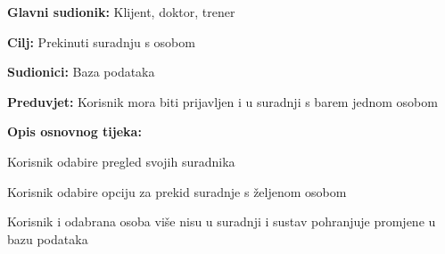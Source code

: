 					\noindent {}
					\begin{packed_item}
						
						\item \textbf{Glavni sudionik:} Klijent, doktor, trener
						\item  \textbf{Cilj:} Prekinuti suradnju s osobom
						\item  \textbf{Sudionici:} Baza podataka
						\item  \textbf{Preduvjet:} Korisnik mora biti prijavljen i u suradnji s barem jednom osobom
						\item  \textbf{Opis osnovnog tijeka:}
						
						\item[] \begin{packed_enum}
							
							\item Korisnik odabire pregled svojih suradnika
							\item Korisnik odabire opciju za prekid suradnje s željenom osobom
							\item Korisnik i odabrana osoba više nisu u suradnji i sustav pohranjuje promjene u bazu podataka
							
						\end{packed_enum}
						
					\end{packed_item}
				
